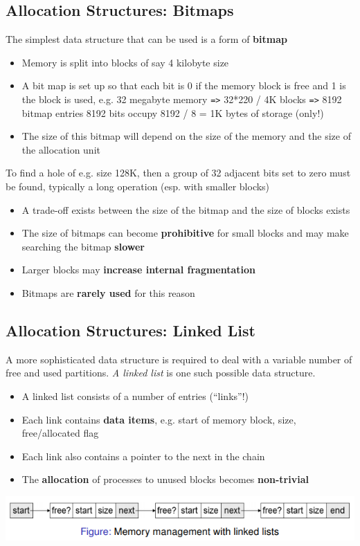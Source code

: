 \documentclass{article}
\begin{document}
\subsection{Allocation Structures: Bitmaps}
\begin{flushleft}
The simplest data structure that can be used is a form of \textbf{bitmap}
\begin{itemize}
	\item Memory is split into blocks of say 4 kilobyte size
	\item A bit map is set up so that each bit is 0 if the memory block is free and 1 is the block is used, e.g. 32 megabyte memory \verb!=>! 32*220 / 4K blocks \verb!=>! 8192 bitmap entries 8192 bits occupy 8192 / 8 = 1K bytes of storage (only!)
	\item The size of this bitmap will depend on the size of the memory and the size of the allocation unit
\end{itemize}
To find a hole of e.g. size 128K, then a group of 32 adjacent bits set to zero must be found, typically a long operation (esp. with smaller blocks)
\begin{itemize}
	\item A trade-off exists between the size of the bitmap and the size of blocks exists
	\item The size of bitmaps can become \textbf{prohibitive} for small blocks and may make searching the bitmap \textbf{slower}
	\item Larger blocks may \textbf{increase internal fragmentation}
	\item Bitmaps are \textbf{rarely used} for this reason
\end{itemize}
\end{flushleft}

\subsection{Allocation Structures: Linked List}
\begin{flushleft}
A more sophisticated data structure is required to deal with a variable number of free and used partitions. \textit{A linked list} is one such possible data structure.
\begin{itemize}
	\item A linked list consists of a number of entries (“links”!)
	\item Each link contains \textbf{data items}, e.g. start of memory block, size, free/allocated flag
	\item Each link also contains a pointer to the next in the chain
	\item The \textbf{allocation} of processes to unused blocks becomes \textbf{non-trivial}
\end{itemize}
\begin{center}
	\includegraphics[scale=0.7]{linked_list.png}
\end{center}
\end{flushleft}
\end{document}
